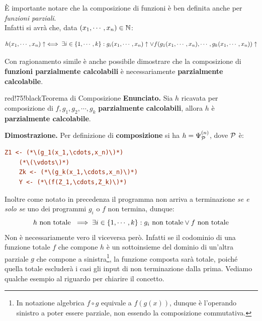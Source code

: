 È importante notare che la composizione di funzioni è ben definita anche per \textit{funzioni parziali}. \\
Infatti si avrà che, data \((x_1,\cdots,x_n) \in \mathbb{N}\):

\begin{equation}
  h(x_1,\cdots,x_n)\uparrow \iff \exists i \in \displaystyle{\left\{{1,\cdots,k}\right\}}: g_i(x_1,\cdots,x_n)\uparrow \vee f(g_1(x_1,\cdots,x_n),\cdots,g_k(x_1,\cdots,x_n))\uparrow
\end{equation}

Con ragionamento simile è anche possibile dimostrare che la composizione di \textbf{funzioni parzialmente calcolabili} è necessariamente \textbf{parzialmente calcolabile}.

\newpage

\begin{halfframedbox}{red!75!black}{Teorema di Composizione}\label{Composizione Teorema}
  \textbf{Enunciato.} Sia \(h\) ricavata per composizione di \(f, g_1, g_2, \cdots,g_k\) \textbf{parzialmente calcolabili}, allora \(h\) è \textbf{parzialmente calcolabile}.

  \begin{center}
    \textcolor{red!75!black}{\hdashrule[0.5ex]{18cm}{1pt}{3mm 3pt 1mm 2pt}}
  \end{center}

  \textbf{Dimostrazione.} Per definizione di \textbf{composizione} si ha \(h=\Psi_{\mathcal{P}}^{(n)}\), dove \(\mathcal{P}\) è:
  \begin{lstlisting}[language=ini, label={Teorema compozione},  caption=Dimostrazione Teorema di Composizione]
    Z1 <- (*\(g_1(x_1,\cdots,x_n)\)*)
    (*\(\vdots\)*)
    Zk <- (*\(g_k(x_1,\cdots,x_n)\)*)
    Y <- (*\(f(Z_1,\cdots,Z_k)\)*)
  \end{lstlisting}
\end{halfframedbox}

Inoltre come notato in precedenza il programma non arriva a terminazione \textit{se e solo se} uno dei programmi \(g_i\) o \(f\) non termina, dunque:
\begin{equation}
   h \text{ non totale } \implies \exists i \in \displaystyle{\left\{{1,\cdots,k}\right\}}: g_i \text{ non totale} \lor f \text{ non totale}
\end{equation}
Non è necessariamente vero il viceversa però. Infatti se il codominio di una funzione totale \(f\) che compone \(h\) è un sottoinsieme del dominio di un'altra parziale \(g\) che compone a sinistra\footnote{In notazione algebrica \(f \circ g\) equivale a \(f(g(x))\), dunque è l'operando sinistro a poter essere parziale, non essendo la composizione commutativa.},
la funzione composta sarà totale, poiché quella totale escluderà i casi gli input di non terminazione dalla prima.
Vediamo qualche esempio al riguardo per chiarire il concetto.


